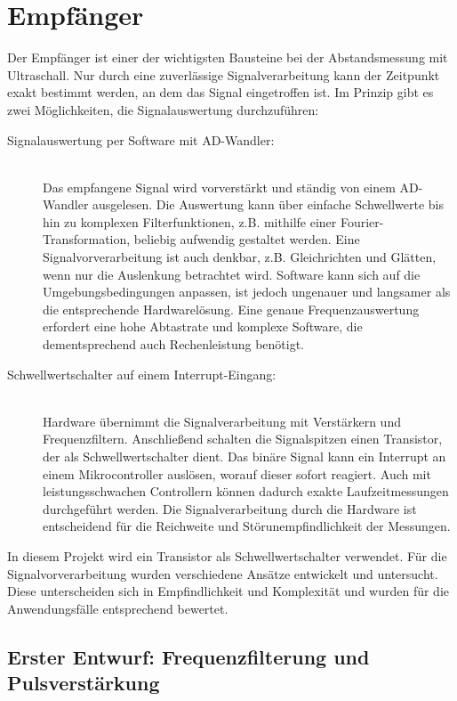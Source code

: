 \section{Empfänger}
Der Empfänger ist einer der wichtigsten Bausteine bei der Abstandsmessung mit Ultraschall. Nur durch eine zuverlässige Signalverarbeitung kann der Zeitpunkt exakt bestimmt werden, an dem das Signal eingetroffen ist. Im Prinzip gibt es zwei Möglichkeiten, die Signalauswertung durchzuführen:
\begin{description} %
	\item[Signalauswertung per Software mit AD-Wandler:]\hspace{1pt}\\
	Das empfangene Signal wird vorverstärkt und ständig von einem AD-Wandler ausgelesen. Die Auswertung kann über einfache Schwellwerte bis hin zu komplexen Filterfunktionen, z.B. mithilfe einer Fourier-Transformation, beliebig aufwendig gestaltet werden. Eine Signalvorverarbeitung ist auch denkbar, z.B. Gleichrichten und Glätten, wenn nur die Auslenkung betrachtet wird. Software kann sich auf die Umgebungsbedingungen anpassen, ist jedoch ungenauer und langsamer als die entsprechende Hardwarelösung. Eine genaue Frequenzauswertung erfordert eine hohe Abtastrate und komplexe Software, die dementsprechend auch Rechenleistung benötigt.
	\item[Schwellwertschalter auf einem Interrupt-Eingang:]\hspace{1pt}\\
	Hardware übernimmt die Signalverarbeitung mit Verstärkern und Frequenzfiltern. Anschließend schalten die Signalspitzen einen Transistor, der als Schwellwertschalter dient. Das binäre Signal kann ein Interrupt an einem Mikrocontroller auslösen, worauf dieser sofort reagiert. Auch mit leistungsschwachen Controllern können dadurch exakte Laufzeitmessungen durchgeführt werden. Die Signalverarbeitung durch die Hardware ist entscheidend für die Reichweite und Störunempfindlichkeit der Messungen.
\end{description}
In diesem Projekt wird ein Transistor als Schwellwertschalter verwendet. Für die Signalvorverarbeitung wurden verschiedene Ansätze entwickelt und untersucht. Diese unterscheiden sich in Empfindlichkeit und Komplexität und wurden für die Anwendungsfälle entsprechend bewertet.



\subsection{Erster Entwurf: Frequenzfilterung und Pulsverstärkung} \label{schaltung:pulse}

